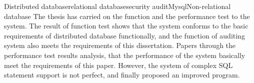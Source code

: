 \begin{Eabstract}{Distributed database}{relational database}{security audit}{Mysql}{Non-relational database}
The thesis has carried on the function and the performance test to the system. The result of function test shows that the system conforms to the basic requirements of distributed database functionally, and the function of auditing system also meets the requirements of this dissertation. Papers through the performance test results analysis, that the performance of the system basically meet the requirements of this paper. However, the system of complex SQL statement support is not perfect, and finally proposed an improved program.
\end{Eabstract}

